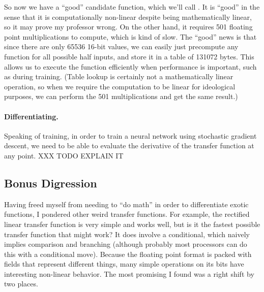 \documentclass[twocolumn]{article}
\begin{document}

So now we have a ``good'' candidate function, which we'll call \gradone.
It is ``good'' in the sense that it is computationally non-linear
despite being mathematically linear, so it may prove my professor
wrong. On the other hand, it requires 501 floating point
multiplications to compute, which is kind of slow. The ``good'' news
is that since there are only 65536 16-bit values, we can easily just
precompute any function for all possible half inputs, and store it in
a table of 131072 bytes. This allows us to execute the function
efficiently when performance is important, such as during training.
(Table lookup is certainly not a mathematically linear operation, so
when we require the computation to be linear for ideological purposes,
we can perform the 501 multiplications and get the same result.)

\paragraph{Differentiating.}
Speaking of training, in order to train a neural network using
stochastic gradient descent, we need to be able to evaluate the
derivative of the transfer function at any point.
 XXX TODO EXPLAIN IT

\subsection{Bonus Digression}
Having freed myself from needing to ``do math'' in order to
differentiate exotic functions, I pondered other weird transfer
functions. For example, the rectified linear transfer function is very
simple and works well, but is it the fastest possible transfer
function that might work? It does involve a conditional, which naively
implies comparison and branching (although probably most processors
can do this with a conditional move). Because the floating point
format is packed with fields that represent different things, many
simple operations on its bits have interesting non-linear behavior.
The most promising I found was a right shift by two places.
\end{document}
